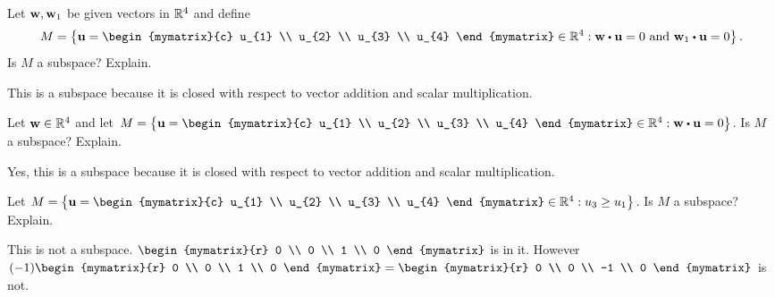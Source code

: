 \begin{enumialphparenastyle}
\begin{ex} Let $\mbox{\bf w},\mbox{\bf w}_{1}$ be given vectors in $\mathbb{R}^{4}$ and define 
\begin{equation*}
M=\set{\vect{u}=\begin{mymatrix}{c}
u_{1} \\
u_{2} \\
u_{3} \\
u_{4}
\end{mymatrix} \in \R
^{4}:\vect{w}\dotprod \vect{u}=0\text{ and }\vect{w}_{1}\dotprod \vect{u}=0}
.
\end{equation*}
Is $M$ a subspace? Explain.
\begin{sol}
This is a subspace because it is closed
with respect to vector addition and scalar multiplication.
\end{sol}
\end{ex}


\begin{ex} Let $\mbox{\bf w}\in \mathbb{R}^{4}$ and let $M=\set{\vect{u}
=\begin{mymatrix}{c}
u_{1} \\
u_{2} \\
u_{3} \\
u_{4}
\end{mymatrix} \in \R^{4}:\vect{w}\dotprod \vect{u}
=0}$. Is $M$ a subspace? Explain.
\begin{sol}
Yes, this is a subspace because it is closed with respect to vector addition and scalar multiplication.
\end{sol}
\end{ex}

\begin{ex} Let $M=\set{\vect{u}=\begin{mymatrix}{c}
u_{1} \\
u_{2} \\
u_{3} \\
u_{4}
\end{mymatrix} \in 
\R^{4}:u_{3}\geq u_{1}}$. Is $M$ a subspace? Explain.
\begin{sol}
This
is not a subspace. $\begin{mymatrix}{r}
0 \\
0 \\
1 \\
0
\end{mymatrix} $ is in it. However $(-1) \begin{mymatrix}{r}
0 \\
0 \\
1 \\
0
\end{mymatrix}  = \begin{mymatrix}{r}
0 \\
0 \\
-1 \\
0
\end{mymatrix} $ is not.
\end{sol}
\end{ex}


\end{enumialphparenastyle}
